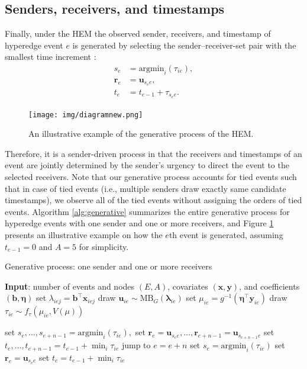 \documentclass[ba]{imsart}
\def\spacingset#1{\renewcommand{\baselinestretch}%
	{#1}\small\normalsize} \spacingset{1}
\numberwithin{equation}{section}
\theoremstyle{plain}
\begin{document}
	\subsection{Senders, receivers, and timestamps}\label{subsec:Observed}
	Finally, under the HEM the observed sender, receivers, and timestamp of hyperedge event $e$ is generated by selecting the sender--receiver-set pair with the smallest time increment \citep{snijders1996stochastic}:
	\begin{equation}
		\begin{aligned}
			s_e &= \mbox{argmin}_{i}(\tau_{ie}),\\
			\boldsymbol{r}_e &= \boldsymbol{u}_{s_e e},\\
			t_e &=t_{e-1} + \tau_{s_e e}.
		\end{aligned}
	\end{equation}
	\begin{figure}[!t]
		\centering
		\texttt{[image: img/diagramnew.png]}	
		\caption {An illustrative example of the generative process of the HEM.}
		\label{figure:diagram}
	\end{figure}	
		Therefore, it is a sender-driven process in that the receivers and timestamps of an event are jointly determined by the sender's urgency to direct the event to the selected receivers. Note that our generative process accounts for tied events such that in case of tied events (i.e., multiple senders draw exactly same candidate timestamps), we observe all of the tied events without assigning the orders of tied events. Algorithm \ref{alg:generative} summarizes the entire generative process for hyperedge events with one sender and one or more receivers, and Figure \ref{figure:diagram} presents an illustrative example on how the $e$th event is generated, assuming $t_{e-1} = 0$ and $A=5$ for simplicity.
	\begin{algorithm}[!t]
		\spacingset{1}
		\SetAlgoLined
		\caption{Generative process: one sender and one or more receivers}
		\begin{algorithmic}
			\STATE \textbf{Input}: number of events and nodes $(E, A)$, covariates $(\boldsymbol{x}, \boldsymbol{y})$, and coefficients $(\boldsymbol{b}, \boldsymbol{\eta})$
			\vskip 0.1in
			\STATE	set $\lambda_{iej} = {\boldsymbol{b}}^{\top}\boldsymbol{x}_{iej}$
			\ENDFOR
			\STATE	draw $\boldsymbol{u}_{ie}  \sim
			\mbox{MB}_G(\boldsymbol{\lambda}_{ie})$
			\STATE		set $\mu_{ie} = g^{-1}(\boldsymbol{\eta}^\top \boldsymbol{y}_{ie})$
			\STATE		draw $\tau_{ie} \sim f_\tau(\mu_{ie}, V(\mu))$
			\ENDFOR
			
			\STATE	set $s_e,\ldots, s_{e+n-1}=\mbox{argmin}_{i}(\tau_{ie}),$
			\STATE	set $\boldsymbol{r}_e=\boldsymbol{u}_{s_e e},\ldots,\boldsymbol{r}_{e+n-1}=\boldsymbol{u}_{s_{e+n-1} e}$
			\STATE	set $t_e, \ldots, t_{e+n-1}=t_{e-1} + \min_i\tau_{ie}$
			\STATE		jump to $e = e+n$
			\ELSE
			\STATE	set $s_e= \mbox{argmin}_{i}(\tau_{ie})$
			\STATE		set $\boldsymbol{r}_e = \boldsymbol{u}_{s_e e}$
			\STATE	set $t_e =t_{e-1} + \min_i\tau_{ie}$
			\ENDIF
			\ENDFOR
		\end{algorithmic}
		\label{alg:generative}
	\end{algorithm}
	
\end{document}

